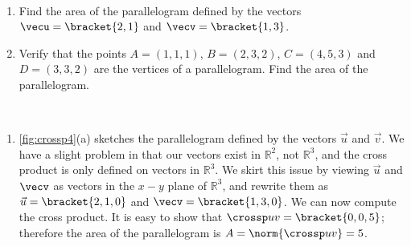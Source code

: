 \begin{example}\label{ex_crossp4}
\mbox{}\\[-2\baselineskip]\parbox[t]{\linewidth}{%
\begin{enumerate}
	\item Find the area of the parallelogram defined by the vectors $\vecu = \bracket{2,1}$ and $\vecv = \bracket{1,3}$.
	\item	Verify that the points $A = (1,1,1)$, $B = (2,3,2)$, $C = (4,5,3)$ and $D = (3,3,2)$ are the vertices of a parallelogram. Find the area of the parallelogram.
\end{enumerate}}\vspace{0pt}
%
%
\solution
\mbox{}\\[-1.5\baselineskip]\parbox[t]{\linewidth}{\begin{enumerate}
	\item \autoref{fig:crossp4}(a) sketches the parallelogram defined by the vectors $\vec u$ and $\vec v$. We have a slight problem in that our vectors exist in $\mathbb{R}^2$, not $\mathbb{R}^3$, and the cross product is only defined on vectors in $\mathbb{R}^3$. We skirt this issue by viewing $\vec u$ and $\vecv$ as vectors in the $x-y$ plane of $\mathbb{R}^3$, and rewrite them as $\vec u = \bracket{2,1,0}$ and $\vecv =\bracket{1,3,0}$. We can now compute the cross product. It is easy to show that $\crossp uv = \bracket{0,0,5}$; therefore the area of the parallelogram is $A = \norm{\crossp uv} = 5$.

\end{enumerate}}
\end{example}
